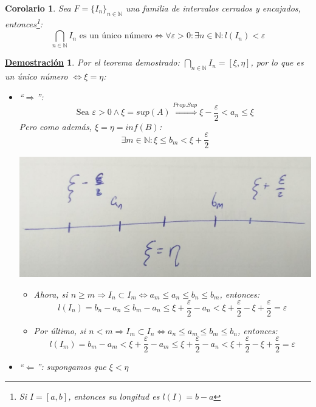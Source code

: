\documentclass[10pt,a4paper,openright]{book}
\theoremstyle{break}
\newtheorem{coro}{Corolario}[theo]
\newtheorem*{demo}{\underline{Demostración}}
\begin{document}
\begin{coro}
Sea $F=\{I_n\}_{n\in \mathbb N}$ una familia de intervalos cerrados y encajados, entonces\footnote{Si $I=[a,b]$, entonces su longitud es $l(I)=b-a$}:
$$\bigcap_{n\in \mathbb N}I_n\mbox{ es un único número}\Leftrightarrow \forall \varepsilon>0: \exists n\in \mathbb N: l(I_n)<\varepsilon$$
\end{coro}
\begin{demo}
Por el teorema demostrado: $\bigcap_{n\in \mathbb N}I_n=[\xi,\eta]$, por lo que es un único número $\Leftrightarrow \xi=\eta$:

\begin{itemize}
\item ``$\Rightarrow$'':
$$\mbox{Sea }\varepsilon>0\wedge \xi=sup(A)\stackrel{Prop. Sup}{\Rightarrow} \xi-\frac{\varepsilon}{2}<a_n\leq \xi$$
Pero como además, $\xi=\eta=inf(B)$:
$$\exists m \in \mathbb N: \xi\leq b_m< \xi+ \frac{\varepsilon}{2}$$

\begin{center}
\includegraphics[scale=0.25]{corolario cantor}
\end{center}

	\begin{itemize}
	\item Ahora, si $n\geq m\Rightarrow I_n\subset I_m\Leftrightarrow a_m\leq a_n\leq b_n\leq b_m$, entonces:
$$l(I_n)=b_n-a_n\leq b_m-a_n\leq \xi+ \frac{\varepsilon}{2}-a_n<\xi+ \frac{\varepsilon}{2}-\xi+ \frac{\varepsilon}{2}=\varepsilon$$

	\item Por último, si $n<m\Rightarrow I_m\subset I_n\Leftrightarrow a_n\leq a_m\leq b_m\leq b_n$, entonces:
$$l(I_m)=b_m-a_m< \xi+\frac{\varepsilon}{2}-a_m\leq \xi+\frac{\varepsilon}{2}-a_n<\xi+\frac{\varepsilon}{2}-\xi+\frac{\varepsilon}{2}=\varepsilon$$
	\end{itemize}

\item ``$\Leftarrow$'': supongamos que $\xi<\eta$


\end{itemize}
\end{demo}
\end{document}
